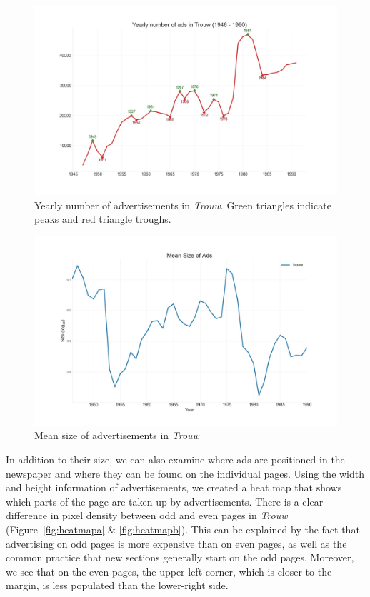 \documentclass[USenglish]{article}
\begin{document}
\begin{figure}%
  \centering
  \includegraphics[width=\textwidth]{figures/Trouw_ad_curve}%
  \caption{Yearly number of advertisements in \textit{Trouw}. Green triangles indicate peaks and red triangle troughs.}%
  \label{fig:ad_curve}%
\end{figure}

\begin{figure}%
  \centering
  \includegraphics[width=\textwidth]{figures/mean_size}%
  \caption{Mean size of advertisements in \textit{Trouw}}
  \label{fig:mean_size}%
\end{figure}


In addition to their size, we can also examine where ads are positioned in the newspaper and where they can be found on the individual pages. Using the width and height information of advertisements, we created a heat map that shows which parts of the page are taken up by advertisements. There is a clear difference in pixel density between odd and even pages in \textit{Trouw} (Figure~\ref{fig:heatmapa} \& \ref{fig:heatmapb}). This can be explained by the fact that advertising on odd pages is more expensive than on even pages, as well as the common practice that new sections generally start on the odd pages. Moreover, we see that on the even pages, the upper-left corner, which is closer to the margin, is less populated than the lower-right side. 
\end{document}

